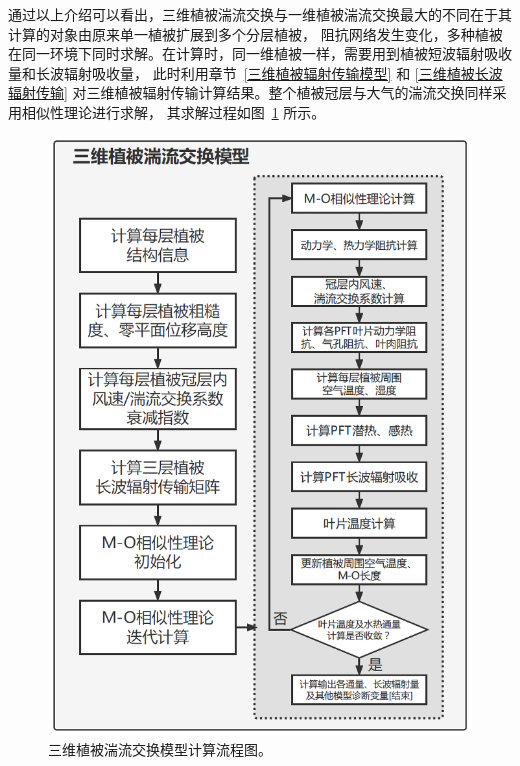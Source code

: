 通过以上介绍可以看出，三维植被湍流交换与一维植被湍流交换最大的不同在于其计算的对象由原来单一植被扩展到多个分层植被，
阻抗网络发生变化，多种植被在同一环境下同时求解。在计算时，同一维植被一样，需要用到植被短波辐射吸收量和长波辐射吸收量，
此时利用章节~\ref{三维植被辐射传输模型} 和 \ref{三维植被长波辐射传输} 对三维植被辐射传输计算结果。整个植被冠层与大气的湍流交换同样采用相似性理论进行求解，
其求解过程如图~\ref{fig:三维植被湍流交换模型计算流程图} 所示。
{
\begin{figure}[]
\centering
\includegraphics{Figures/地表湍流交换过程/三维植被湍流交换模型计算流程图.png}
\caption{三维植被湍流交换模型计算流程图。}
\label{fig:三维植被湍流交换模型计算流程图}
\end{figure}
}


